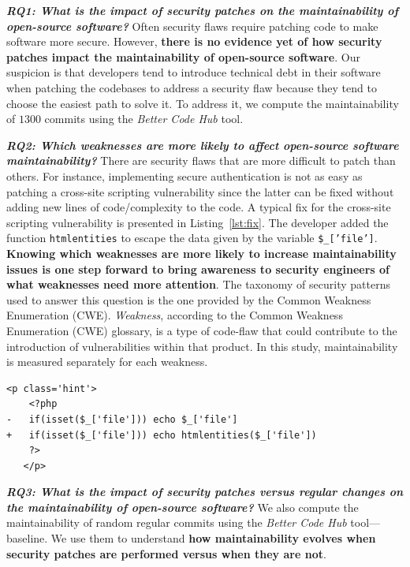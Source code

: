 \documentclass[smallextended]{svjour3}       %
\newcounter{lstannotation}
\begin{document}
\textit{\textbf{RQ1: What is the impact of security patches on the
maintainability of open-source software?}} Often security flaws 
require patching code to make software more secure. However, 
\textbf{there is no evidence yet of how security patches impact the
maintainability of open-source software}. Our suspicion is that 
developers tend to introduce technical debt in their software when 
patching the codebases to address a security flaw because they tend 
to choose the easiest path to solve it. To address it, we compute 
the maintainability of $1300$ commits using the \emph{Better Code Hub} tool. 

\textit{\textbf{RQ2: Which weaknesses are more likely to
affect open-source software maintainability?}} There are security 
flaws that are more difficult to patch than others. For instance, 
implementing secure authentication is not as easy as patching a
cross-site scripting vulnerability since the latter can be fixed
without adding new lines of code/complexity to the code. A typical 
fix for the cross-site scripting vulnerability is presented in 
Listing~\ref{lst:fix}. The developer added the function 
\texttt{htmlentities} to escape the data given by the variable
\texttt{\$\_['file']}. \textbf{Knowing which weaknesses are more 
likely to increase maintainability issues is one step forward to 
bring awareness to security engineers of what weaknesses need more 
attention}. The taxonomy of security patterns used to answer this 
question is the one provided by the Common Weakness Enumeration
(CWE). \emph{Weakness}, according to the Common Weakness Enumeration 
(CWE) glossary, is a type of code-flaw that could contribute to the 
introduction of vulnerabilities within that product. In this study, maintainability 
is measured separately for each weakness.
%
\setcounter{lstannotation}{0}
\begin{lstlisting}[style={PHPStyle}, caption={Fix provided by \texttt{nextcloud/server} developers to a Cross-Site Scripting vulnerability},label={lst:fix}]
   <p class='hint'>
    <?php
-   if(isset($_['file'])) echo $_['file']
+   if(isset($_['file'])) echo htmlentities($_['file'])
    ?>
   </p>
\end{lstlisting}
%
\textit{\textbf{RQ3: What is the impact of security patches versus 
regular changes on the maintainability of open-source software?}}
%
We also compute the maintainability of random regular commits using 
the \emph{Better Code Hub} tool---baseline. We use them to 
understand \textbf{how maintainability evolves when security patches 
are performed versus when they are not}.
%
\end{document}
